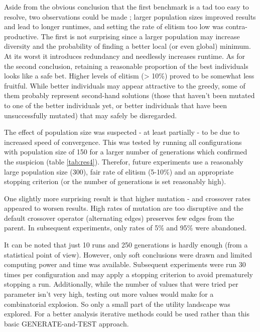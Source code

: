 \par\noindent Aside from the obvious conclusion that the first benchmark is a tad too easy to resolve, two observations could be made ; larger population sizes improved results and lead to longer runtimes, and setting the rate of elitism too low was contra-productive. The first is not surprising since a larger population may increase diversity and the probability of finding a better local (or even global) minimum. At its worst it introduces redundancy and needlessly increases runtime. As for the second conclusion, retaining a reasonable proportion of the best individuals looks like a safe bet. Higher levels of elitism (> 10\%) proved to be somewhat less fruitful. While better individuals may appear attractive to the greedy, some of them probably represent second-hand solutions (those that haven't been mutated to one of the better individuals yet, or better individuals that have been unsuccessfully mutated) that may safely be disregarded.\\

\par\noindent The effect of population size was suspected - at least partially - to be due to increased speed of convergence. This was tested by running all configurations with population size of 150 for a larger number of generations which confirmed the suspicion (table \ref{tab:res4}). Therefor, future experiments use a reasonably large population size (300), fair rate of elitism (5-10\%) and an appropriate stopping criterion (or the number of generations is set reasonably high).\\

\par\noindent One slightly more surprising result is that higher mutation - and crossover rates appeared to worsen results. High rates of mutation are too disruptive and the default crossover operator (alternating edges) preserves few edges from the parent. In subsequent experiments, only rates of 5\% and 95\% were abandoned.\\

\par\noindent It can be noted that just 10 runs and 250 generations is hardly enough (from a statistical point of view). However, only soft conclusions were drawn and limited computing power and time was available. Subsequent experiments were run 30 times per configuration and may apply a stopping criterion to avoid prematurely stopping a run. Additionally, while the number of values that were tried per parameter isn't very high, testing out more values would make for a combinatorial explosion. So only a small part of the utility landscape was explored. For a better analysis iterative methods could be used rather than this basic GENERATE-and-TEST approach.

